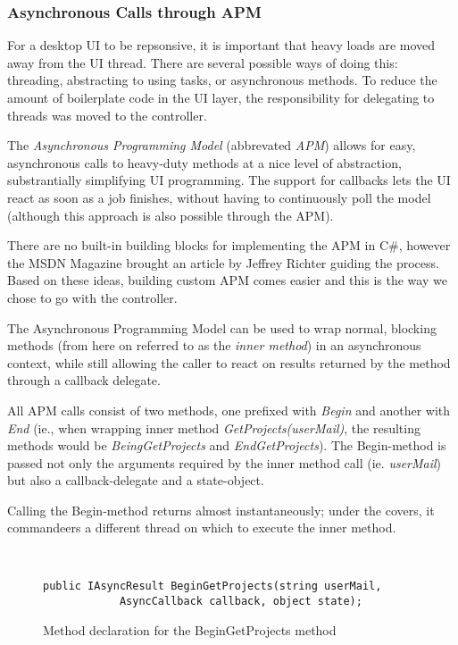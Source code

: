 \subsubsection{Asynchronous Calls through APM}
\label{sec:APM}

For a desktop UI to be repsonsive, it is important that heavy loads are moved away from the UI thread.
There are several possible ways of doing this: threading, abstracting to using tasks, or asynchronous
methods. To reduce the amount of boilerplate code in the UI layer, the responsibility for delegating
to threads was moved to the controller.

The \emph{Asynchronous Programming Model}\cite{msdnAPMdoc} (abbrevated \emph{APM}) allows for easy,
asynchronous calls to heavy-duty methods at a nice level of abstraction, substrantially simplifying UI
programming. The support for callbacks lets the UI react as soon as a job finishes, without having to
continuously poll the model (although this approach is also possible through the APM).

There are no built-in building blocks for implementing the APM in C\#, however the MSDN Magazine\cite{richtermsdn0307}
brought an article by Jeffrey Richter guiding the process. Based on these ideas, building custom APM comes easier and
this is the way we chose to go with the controller.

The Asynchronous Programming Model can be used to wrap normal, blocking methods (from here on referred to as
the \emph{inner method}) in an asynchronous context, while still allowing the caller to react on results
returned by the method through a callback delegate.

All APM calls consist of two methods, one prefixed with \emph{Begin} and another with \emph{End} (ie.,
when wrapping inner method \emph{GetProjects(userMail)}, the resulting methods would be \emph{BeingGetProjects}
and \emph{EndGetProjects}). The Begin-method is passed not only the arguments required by the inner method call
(ie. \emph{userMail}) but also a callback-delegate and a state-object.

Calling the Begin-method returns almost instantaneously; under the covers, it commandeers a different thread
on which to execute the inner method.

\begin{figure}[hbt]
    \begin{verbatim}
    
    
public IAsyncResult BeginGetProjects(string userMail,
            AsyncCallback callback, object state);\end{verbatim}
    \caption{Method declaration for the BeginGetProjects method}
    \label{fig:begingetprojectscode}
\end{figure}

